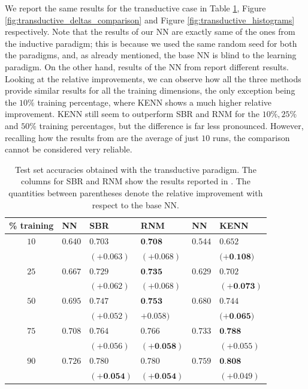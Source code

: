 We report the same results for the transductive case in Table \ref{tab:resultstransductive}, Figure \ref{fig:transductive_deltas_comparison} and Figure \ref{fig:transductive_histograms} respectively. Note that the results of our NN are exactly same of the ones from the inductive paradigm; this is because we used the same random seed for both the paradigms, and, as already mentioned, the base NN is blind to the learning paradigm. On the other hand, results of the NN from \cite{marra2020relational} report different results. Looking at the relative improvements, we can observe how all the three methods provide similar results for all the training dimensions, the only exception being the $10\%$ training percentage, where KENN shows a much higher relative improvement. KENN still seem to outperform SBR and RNM for the $10\%,25\%$ and $50\%$ training percentages, but the difference is far less pronounced. However, recalling how the results from \cite{marra2020relational} are the average of just $10$ runs, the comparison cannot be considered very reliable.





\begin{table}[h]
	\caption{Test set accuracies obtained with the transductive paradigm. The columns for SBR and RNM show the results reported in \cite{marra2020relational}. The quantities between parentheses denote the relative improvement with respect to the base NN.}
	\label{tab:resultstransductive}
	\centering
\begin{tabular}{c|lll|ll} 
	\% training & NN & SBR & RNM & NN & KENN \\
	\hline 
	\rule{0pt}{3ex} $10$ & $0.640$ & $0.703$ & $\mathbf{0 . 7 0 8}$ & $0.544$ & $0.652$ \\
	& & $(+0.063)$ & $(+0.068)$ & & $(+\mathbf{0 . 1 0 8 )}$ \\
	$25$ & $0.667$ & $0.729$ & $\mathbf{0 . 7 3 5}$ & $0.629$ & $0.702$ \\
	& & $(+0.062)$ & $(+0.068)$ & & $(+\mathbf{0 . 0 7 3})$ \\
	$50$ & $0.695$ & $0.747$ & $\mathbf{0 . 7 5 3}$ & $0.680$ & $0.744$ \\
	& & $(+0.052)$ & $+0.058)$ & & $(+\mathbf{0 . 0 6 5 )}$ \\
	$75$ & $0.708$ & $0.764$ & $0.766$ & $0.733$ & $\mathbf{0 . 7 8 8}$ \\
	& & $(+0.056)$ & $(+\mathbf{0 . 0 5 8})$ & & $(+0.055)$ \\
	$90$ & $0.726$ & $0.780$ & $0.780$ & $0.759$ & $\mathbf{0 . 8 0 8}$ \\
	& & $\mathbf{( + 0 . 0 5 4 )}$ & $\mathbf{( + 0 . 0 5 4 )}$ & & $(+0.049)$ \\
	\hline \hline
\end{tabular}
\end{table}



